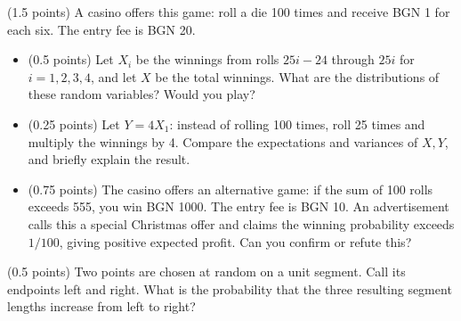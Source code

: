 \documentclass[a4paper]{report}
\begin{document}
\begin{problem} (1.5 points)
A casino offers this game: roll a die 100 times and receive BGN 1 for each six. The entry fee is BGN 20.

\begin{itemize}
    \item (0.5 points) Let
$X_i$ be the winnings from rolls $25i-24$ through $25i$
for $i=1,2,3,4$, and let $X$ be the total winnings. What are the distributions of these
random variables? Would you play?

\item (0.25 points) Let $Y=4X_1$: instead of rolling 100 times, roll 25 times and multiply
the winnings by 4. Compare the expectations and variances of $X,Y$, and briefly explain
the result.

\item (0.75 points)
The casino offers an alternative game: if the sum of 100 rolls exceeds 555, you win BGN 1000. The entry fee is BGN 10.
An advertisement calls this a special Christmas offer and claims the winning probability exceeds $1/100$, giving positive expected profit. Can you confirm or refute this?



\end{itemize}


\end{problem}

\begin{problem} (0.5 points)
Two points are chosen at random on a unit segment. Call its endpoints left and right. What is the probability
that the three resulting segment lengths increase from left to right?
\end{problem}
\end{document}

